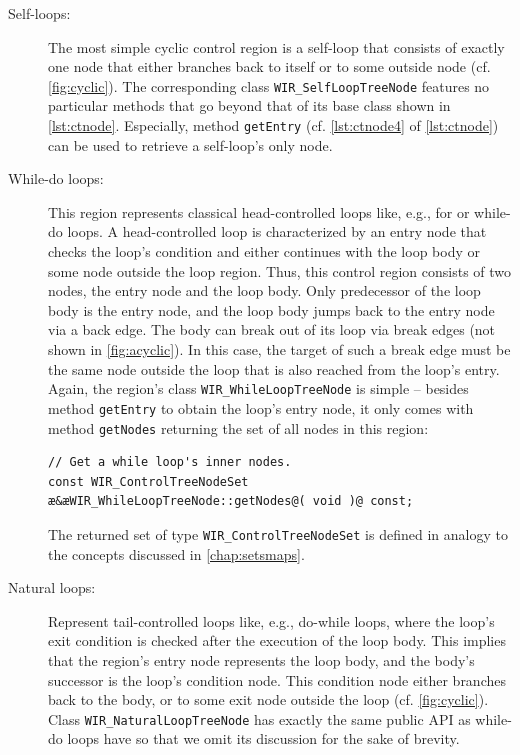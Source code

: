 \begin{description}
  \item[Self-loops:] The most simple cyclic control region is a self-loop that consists of exactly one node that either branches back to itself or to some outside node (cf. \cref{fig:cyclic}).
  The corresponding class \texttt{WIR\_SelfLoop\-TreeNode} features no particular methods that go beyond that of its base class shown in \cref{lst:ctnode}.
  Especially, method \texttt{getEntry} (cf. \cref{lst:ctnode4} of \cref{lst:ctnode}) can be used to retrieve a self-loop's only node.

  \item[While-do loops:] This region represents classical head-controlled loops like, e.g., for or while-do loops.
  A head-controlled loop is characterized by an entry node that checks the loop's condition and either continues with the loop body or some node outside the loop region.
  Thus, this control region consists of two nodes, the entry node and the loop body.
  Only predecessor of the loop body is the entry node, and the loop body jumps back to the entry node via a back edge.
  The body can break out of its loop via break edges (not shown in \cref{fig:acyclic}).
  In this case, the target of such a break edge must be the same node outside the loop that is also reached from the loop's entry.
  Again, the region's class \texttt{WIR\_WhileLoopTreeNode} is simple -- besides method \texttt{getEntry} to obtain the loop's entry node, it only comes with method \texttt{getNodes} returning the set of all nodes in this region:
\begin{lstlisting}[style=code,float=!h,xleftmargin=10mm]
// Get a while loop's inner nodes.
const WIR_ControlTreeNodeSet æ&æWIR_WhileLoopTreeNode::getNodes@( void )@ const;
\end{lstlisting}

  The returned set of type \texttt{WIR\_ControlTreeNodeSet} is defined in analogy to the concepts discussed in \cref{chap:setsmaps}.

  \item[Natural loops:] Represent tail-controlled loops like, e.g., do-while loops, where the loop's exit condition is checked after the execution of the loop body.
  This implies that the region's entry node represents the loop body, and the body's successor is the loop's condition node.
  This condition node either branches back to the body, or to some exit node outside the loop (cf. \cref{fig:cyclic}).
  Class \texttt{WIR\_NaturalLoopTreeNode} has exactly the same public \gls{API} as while-do loops have so that we omit its discussion for the sake of brevity.
\end{description}

